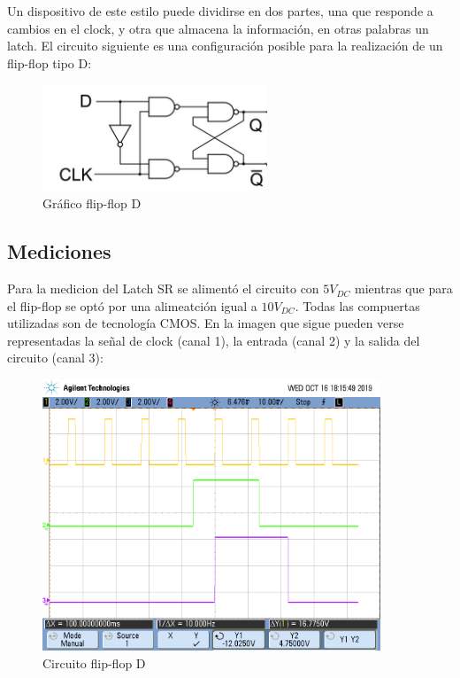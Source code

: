Un dispositivo de este estilo puede dividirse en dos partes, una que responde a cambios en el clock, y otra que almacena la información, en otras palabras un latch. El circuito siguiente es una configuración posible para la realización de un flip-flop tipo D:

\begin{figure}[H]
	\centering
	\includegraphics[width=0.6\textwidth]{Ejercicio6/Recursos/ffD_final}
	\caption{Gráfico flip-flop D}
\end{figure}


\subsection{Mediciones}
Para la medicion del Latch SR se alimentó el circuito con $5V_{DC}$ mientras que para el flip-flop se optó por una alimeatción igual a $10V_{DC}$. Todas las compuertas utilizadas son de tecnología CMOS. En la imagen que sigue pueden verse representadas la señal de clock (canal 1), la entrada (canal 2) y la salida del circuito (canal 3):

\begin{figure}[H]
	\centering
	\includegraphics[width=0.9\textwidth]{Ejercicio6/Recursos/senales_ffD.png}
	\caption{Circuito flip-flop D}
\end{figure}

